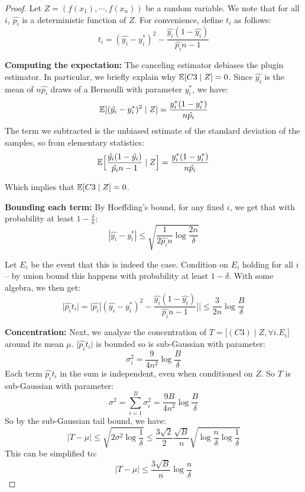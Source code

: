 \begin{proof}
Let $Z = (f(x_1), \cdots, f(x_n))$ be a random variable. We note that for all $i$, $\hat{p_i}$ is a deterministic function of $Z$. For convenience, define $t_i$ as follows:
\[ t_i = (\hat{y_i} - y_i^*)^2 - \frac{\hat{y_i}(1 - \hat{y_i})}{\hat{p_i}n-1} \]

\textbf{Computing the expectation:} The canceling estimator debiases the plugin estimator. In particular, we briefly explain why $\mathbb{E}[C3 \mid Z] = 0$. Since $\hat{y_i}$ is the mean of $n\hat{p_i}$ draws of a Bernoulli with parameter $y_i^*$, we have:
\[ \mathbb{E}[(\hat{y_i} - y_i^*)^2 \mid Z] = \frac{y_i^*(1 - y_i^*)}{n\hat{p_i}} \] 
The term we subtracted is the unbiased estimate of the standard deviation of the samples, so from elementary statistics:
\[ \mathbb{E}\Big[\frac{\hat{y_i}(1 - \hat{y_i})}{\hat{p_i}n-1} \mid Z\Big] = \frac{y_i^*(1 - y_i^*)}{n\hat{p_i}} \]

Which implies that $\mathbb{E}[C3 \mid Z] = 0$.

\textbf{Bounding each term:} By Hoeffding's bound, for any fixed $i$, we get that with probability at least $1 - \frac{\delta}{n}$: 
\[ |\hat{y_i} - y_i^*| \leq \sqrt{\frac{1}{2\hat{p_i}n} \log{\frac{2n}{\delta}}} \]

Let $E_i$ be the event that this is indeed the case. Condition on $E_i$ holding for all $i$ -- by union bound this happens with probability at least $1 - \delta$.
With some algebra, we then get:
\[ \lvert \hat{p_i}t_i \rvert = \Big\lvert \hat{p_i}\Big[ (\hat{y_i} - y_i^*)^2 - \frac{\hat{y_i}(1 - \hat{y_i})}{\hat{p_i}n-1} \Big] \Big\rvert \leq \frac{3}{2n} \log{\frac{B}{\delta}} \]

\textbf{Concentration:} Next, we analyze the concentration of $T = \big[(C3) \mid Z, \forall i. E_i\big]$ around its mean $\mu$. $\lvert \hat{p_i}t_i \rvert$ is bounded so is sub-Gaussian with parameter:
\[ \sigma_i^2 = \frac{9}{4n^2}\log{\frac{B}{\delta}} \]
Each term $\hat{p_i}t_i$ in the sum is independent, even when conditioned on $Z$.
So $T$ is sub-Gaussian with parameter:
\[ \sigma^2 = \sum_{i=1}^B \sigma_i^2 = \frac{9B}{4n^2}\log{\frac{B}{\delta}} \]
So by the sub-Gaussian tail bound, we have:
\[ \lvert T - \mu \rvert \leq \sqrt{2\sigma^2\log{\frac{1}{\delta}}} \leq \frac{3\sqrt{2}}{2} \frac{\sqrt{B}}{n} \sqrt{\log{\frac{n}{\delta}} \log{\frac{1}{\delta}}} \]
This can be simplified to:
\[ \lvert T - \mu \rvert \leq \frac{3\sqrt{B}}{n} \log{\frac{n}{\delta}} \]


\end{proof}
